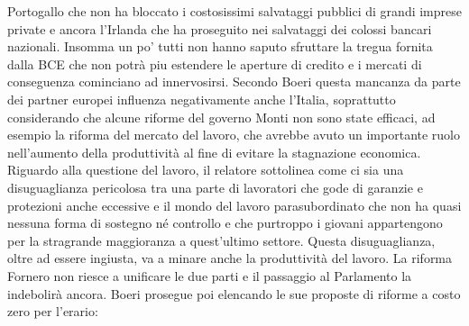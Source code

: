 \documentclass[11pt]{article}
\begin{document}
Portogallo che non ha bloccato i costosissimi salvataggi pubblici di grandi imprese
private e ancora l'Irlanda che ha proseguito nei salvataggi dei colossi bancari nazionali.
Insomma un po' tutti non hanno saputo sfruttare la tregua fornita dalla BCE che non potrà piu estendere
le aperture di credito e i mercati di conseguenza cominciano ad innervosirsi.
Secondo Boeri questa mancanza da parte dei partner europei influenza negativamente anche l'Italia, soprattutto considerando che
alcune riforme del governo Monti non sono state efficaci, ad esempio la riforma del mercato del 
lavoro, che avrebbe avuto un importante ruolo nell'aumento della produttività al fine di evitare la stagnazione economica.
Riguardo alla questione del lavoro, il relatore sottolinea come ci sia una disuguaglianza pericolosa
tra una parte di lavoratori che gode di garanzie e protezioni anche eccessive e il mondo del lavoro parasubordinato
che non ha quasi nessuna forma di sostegno né controllo e che purtroppo i giovani appartengono
per la stragrande maggioranza a quest'ultimo settore. Questa disuguaglianza, oltre ad essere ingiusta,
va a minare anche la produttività del lavoro. La riforma Fornero non riesce a unificare le due parti e il passaggio al Parlamento
la indebolirà ancora.
Boeri prosegue poi elencando le sue proposte di riforme a costo zero per l'erario:
\end{document}
